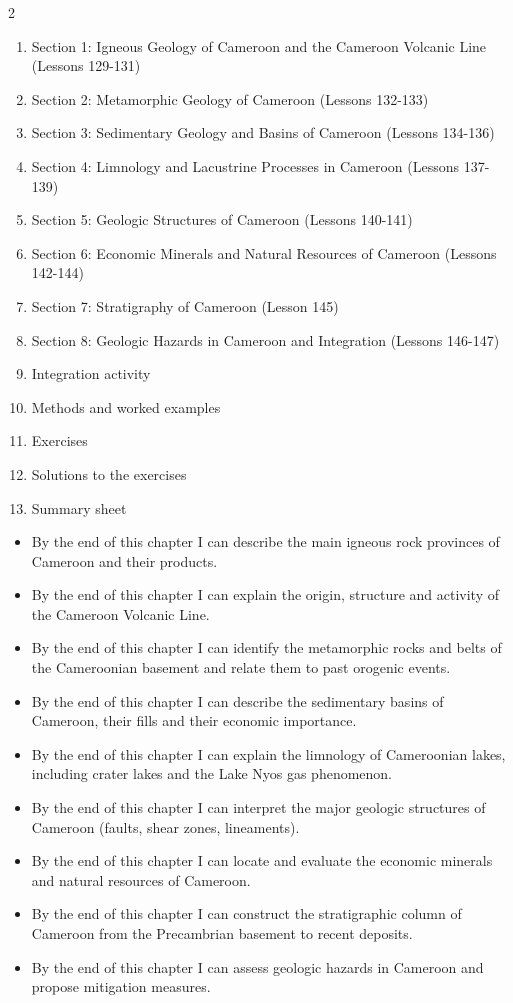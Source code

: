 \documentclass[11pt]{article}
\begin{document}
\begin{sommaire}
\begin{multicols}{2}
\begin{enumerate}
\item Section 1: Igneous Geology of Cameroon and the Cameroon Volcanic Line (Lessons 129-131)
\item Section 2: Metamorphic Geology of Cameroon (Lessons 132-133)
\item Section 3: Sedimentary Geology and Basins of Cameroon (Lessons 134-136)
\item Section 4: Limnology and Lacustrine Processes in Cameroon (Lessons 137-139)
\item Section 5: Geologic Structures of Cameroon (Lessons 140-141)
\item Section 6: Economic Minerals and Natural Resources of Cameroon (Lessons 142-144)
\item Section 7: Stratigraphy of Cameroon (Lesson 145)
\item Section 8: Geologic Hazards in Cameroon and Integration (Lessons 146-147)
\item Integration activity
\item Methods and worked examples
\item Exercises
\item Solutions to the exercises
\item Summary sheet
\end{enumerate}
\end{multicols}
\end{sommaire}

\begin{objectifs}
\begin{itemize}
\item By the end of this chapter I can describe the main igneous rock provinces of Cameroon and their products.
\item By the end of this chapter I can explain the origin, structure and activity of the Cameroon Volcanic Line.
\item By the end of this chapter I can identify the metamorphic rocks and belts of the Cameroonian basement and relate them to past orogenic events.
\item By the end of this chapter I can describe the sedimentary basins of Cameroon, their fills and their economic importance.
\item By the end of this chapter I can explain the limnology of Cameroonian lakes, including crater lakes and the Lake Nyos gas phenomenon.
\item By the end of this chapter I can interpret the major geologic structures of Cameroon (faults, shear zones, lineaments).
\item By the end of this chapter I can locate and evaluate the economic minerals and natural resources of Cameroon.
\item By the end of this chapter I can construct the stratigraphic column of Cameroon from the Precambrian basement to recent deposits.
\item By the end of this chapter I can assess geologic hazards in Cameroon and propose mitigation measures.
\end{itemize}
\end{objectifs}
\end{document}
